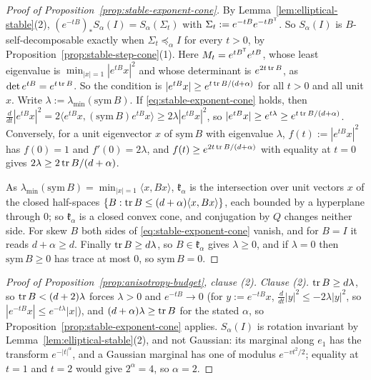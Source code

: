 \begin{proof}[Proof of Proposition~\ref{prop:stable-exponent-cone}]
By Lemma~\ref{lem:elliptical-stable}(2), $(e^{-tB})_*S_\alpha(I) = S_\alpha(\Sigma_t)$ with
$\Sigma_t := e^{-tB}e^{-tB^{\mathsf{T}}}$. So $S_\alpha(I)$ is $B$-self-decomposable exactly when
$\Sigma_t \preceq_\alpha I$ for every $t > 0$, by Proposition~\ref{prop:stable-step-cone}(1). Here
$M_t = e^{tB^{\mathsf{T}}}e^{tB}$, whose least eigenvalue is $\min_{|x|=1}|e^{tB}x|^2$ and whose determinant is
$e^{2t\operatorname{tr} B}$, as $\det e^{tB} = e^{t\operatorname{tr} B}$. So the condition is $|e^{tB}x| \ge e^{t\operatorname{tr} B/(d+\alpha)}$ for all $t > 0$ and all unit
$x$. Write $\lambda := \lambda_{\min}(\mathrm{sym}\,B)$. If \ref{eq:stable-exponent-cone} holds, then
$\tfrac{d}{dt}|e^{tB}x|^2 = 2\langle e^{tB}x,(\mathrm{sym}\,B)e^{tB}x\rangle \ge 2\lambda|e^{tB}x|^2$, so
$|e^{tB}x| \ge e^{t\lambda} \ge e^{t\operatorname{tr} B/(d+\alpha)}$. Conversely, for a unit eigenvector $x$ of
$\mathrm{sym}\,B$ with eigenvalue $\lambda$, $f(t) := |e^{tB}x|^2$ has $f(0) = 1$ and $f'(0) = 2\lambda$,
and $f(t) \ge e^{2t\operatorname{tr} B/(d+\alpha)}$ with equality at $t = 0$ gives
$2\lambda \ge 2\operatorname{tr} B/(d+\alpha)$.

As $\lambda_{\min}(\mathrm{sym}\,B) = \min_{|x|=1}\langle x,Bx\rangle$, $\mathfrak k_\alpha$ is the intersection
over unit vectors $x$ of the closed half-spaces $\{B : \operatorname{tr} B \le (d+\alpha)\langle x,Bx\rangle\}$, each
bounded by a hyperplane through $0$; so $\mathfrak k_\alpha$ is a closed convex cone, and conjugation by $Q$
changes neither side. For skew $B$
both sides of \ref{eq:stable-exponent-cone} vanish, and for $B = I$ it reads $d + \alpha \ge d$.
Finally $\operatorname{tr} B \ge d\lambda$, so $B \in \mathfrak k_\alpha$ gives $\lambda \ge 0$, and if $\lambda = 0$ then
$\mathrm{sym}\,B \ge 0$ has trace at most $0$, so $\mathrm{sym}\,B = 0$.
\end{proof}

\begin{proof}[Proof of Proposition~\ref{prop:anisotropy-budget}, clause (2)]
\emph{Clause (2).} $\operatorname{tr} B \ge d\lambda$, so $\operatorname{tr} B < (d+2)\lambda$ forces $\lambda > 0$ and
$e^{-tB} \to 0$ (for $y := e^{-tB}x$, $\tfrac{d}{dt}|y|^2 \le -2\lambda|y|^2$, so
$|e^{-tB}x| \le e^{-t\lambda}|x|$), and $(d+\alpha)\lambda \ge \operatorname{tr} B$ for the stated $\alpha$, so
Proposition~\ref{prop:stable-exponent-cone} applies. $S_\alpha(I)$ is rotation invariant by
Lemma~\ref{lem:elliptical-stable}(2), and not Gaussian: its marginal along $e_1$ has the transform
$e^{-|t|^\alpha}$, and a Gaussian marginal has one of modulus $e^{-vt^2/2}$; equality at $t = 1$ and
$t = 2$ would give $2^\alpha = 4$, so $\alpha = 2$.

\end{proof}

